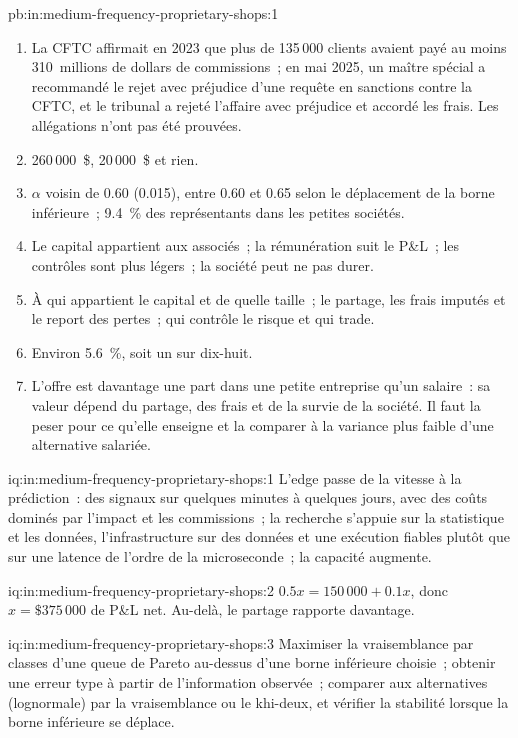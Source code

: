 \begin{solution}{pb:in:medium-frequency-proprietary-shops:1}
\begin{enumerate}
clients, non son personnel.
\item La CFTC affirmait en 2023 que plus de 135\,000 clients avaient payé au moins 310~millions de dollars de commissions~; en mai 2025, un maître spécial
a recommandé le rejet avec préjudice d'une requête en sanctions contre la CFTC, et le tribunal a rejeté l'affaire avec
préjudice et accordé les frais. Les allégations n'ont pas été prouvées.
\item 260\,000~\$, 20\,000~\$ et rien.
\item $\alpha$ voisin de 0.60 (0.015), entre 0.60 et 0.65 selon le déplacement de la borne inférieure~; 9.4~\% des représentants dans les petites sociétés.
\item Le capital appartient aux associés~; la rémunération suit le P\&L~; les contrôles sont plus légers~; la société peut ne pas durer.
\item À qui appartient le capital et de quelle taille~; le partage, les frais imputés et le report des pertes~; qui contrôle le risque et qui trade.
\item Environ 5.6~\%, soit un sur dix-huit.
\item L'offre est davantage une part dans une petite entreprise qu'un salaire~: sa valeur dépend du partage, des frais et de la
survie de la société. Il faut la peser pour ce qu'elle enseigne et la comparer à la variance plus faible d'une alternative salariée.
\end{enumerate}
\end{solution}

\begin{solution}{iq:in:medium-frequency-proprietary-shops:1}
L'edge passe de la vitesse à la prédiction~: des signaux sur quelques minutes à quelques jours, avec des coûts dominés par l'impact et les commissions~; la recherche
s'appuie sur la statistique et les données, l'infrastructure sur des données et une exécution fiables plutôt que sur une latence de l'ordre de la microseconde~; la capacité
augmente.
\end{solution}

\begin{solution}{iq:in:medium-frequency-proprietary-shops:2}
$0.5x=150\,000+0.1x$, donc $x=\$375\,000$ de P\&L net. Au-delà, le partage rapporte davantage.
\end{solution}

\begin{solution}{iq:in:medium-frequency-proprietary-shops:3}
Maximiser la vraisemblance par classes d'une queue de Pareto au-dessus d'une borne inférieure choisie~; obtenir une erreur type à partir de l'information
observée~; comparer aux alternatives (lognormale) par la vraisemblance ou le khi-deux, et vérifier la stabilité lorsque la borne inférieure
se déplace.
\end{solution}

